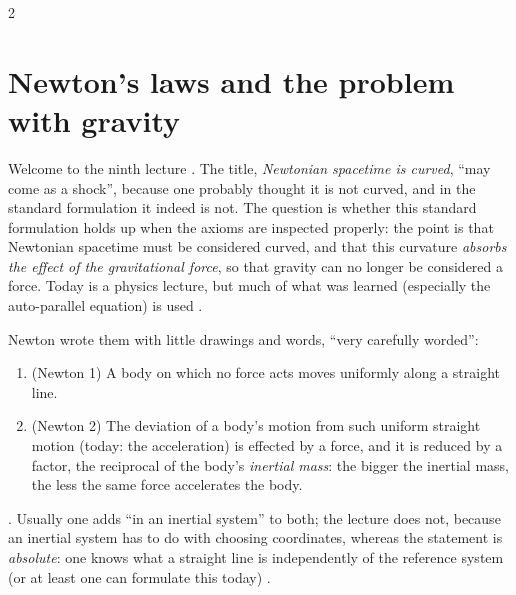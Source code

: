\begin{paracol}{2}
\section{Newton's laws and the problem with gravity}\label{sec:c09-newton}

Welcome to the ninth lecture . The title, \emph{Newtonian spacetime is curved}, ``may come as a shock'', because one probably thought it is not curved, and in the standard formulation it indeed is not. The question is whether this standard formulation holds up when the axioms are inspected properly: the point is that Newtonian spacetime must be considered curved, and that this curvature \emph{absorbs the effect of the gravitational force}, so that gravity can no longer be considered a force. Today is a physics lecture, but much of what was learned (especially the auto-parallel equation) is used
.

\begin{definition}\label{def:c09-newton}
Newton wrote them with little drawings and words, ``very carefully worded'':
\begin{enumerate}
  \item (Newton 1) A body on which no force acts moves uniformly along a straight line.
  \item (Newton 2) The deviation of a body's motion from such uniform straight motion (today: the acceleration) is effected by a force, and it is reduced by a factor, the reciprocal of the body's \emph{inertial mass}: the bigger the inertial mass, the less the same force accelerates the body.
\end{enumerate}
\end{definition}
.
Usually one adds ``in an inertial system'' to both; the lecture does not, because an inertial system has to do with choosing coordinates, whereas the statement is \emph{absolute}: one knows what a straight line is independently of the reference system (or at least one can formulate this today)
.


\end{paracol}

